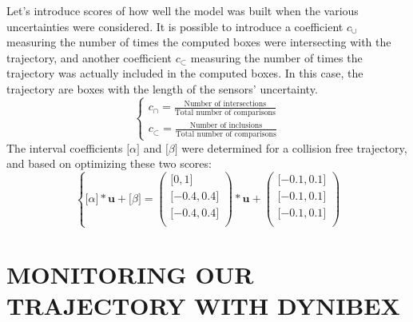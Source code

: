 \documentclass[letterpaper, 10 pt, conference]{ieeeconf}  %
\begin{document}
Let's introduce scores of how well the model was built when the various uncertainties were considered. It is possible to introduce a coefficient $c_{\cup}$ measuring the number of times the computed boxes were intersecting with the trajectory, and another coefficient $c_{\subset}$ measuring the number of times the trajectory was actually included in the computed boxes. In this case, the trajectory are boxes with the length of the sensors' uncertainty.
\begin{equation}
    \left\{
    \begin{array}{ll}
        c_{\cap} = \frac{\text{Number of intersections}}{\text{Total number of comparisons}} \\
        c_{\subset} = \frac{\text{Number of inclusions}}{\text{Total number of comparisons}}
    \end{array}
    \right.
\end{equation}
The interval coefficients $\lbrack \alpha \rbrack$ and $\lbrack \beta \rbrack$ were determined for a collision free trajectory, and based on optimizing these two scores:
\begin{equation}
    \left\{
    \lbrack \alpha \rbrack * \textbf{u} + \lbrack \beta \rbrack = 
    \begin{pmatrix}
        \lbrack 0, 1 \rbrack \\
        \lbrack -0.4, 0.4 \rbrack \\
        \lbrack -0.4, 0.4 \rbrack \\
    \end{pmatrix}
    * \textbf{u} +
    \begin{pmatrix}
        \lbrack -0.1, 0.1 \rbrack \\
        \lbrack -0.1, 0.1 \rbrack \\
        \lbrack -0.1, 0.1 \rbrack \\
    \end{pmatrix}
    \right.
\end{equation}
\vspace{0.1cm}
\section{MONITORING OUR TRAJECTORY WITH DYNIBEX}
\end{document}
